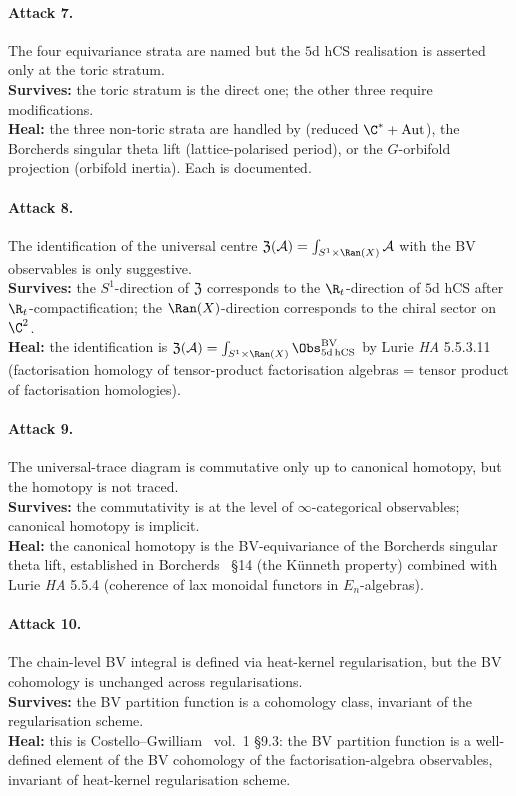 \paragraph{Attack 7.}
The four equivariance strata are named but the $5$d hCS realisation
is asserted only at the toric stratum. \\
\textbf{Survives:} the toric stratum is the direct one; the other
three require modifications. \\
\textbf{Heal:} the three non-toric strata are handled by
(reduced $\C^* + \mathrm{Aut}$), the Borcherds singular theta lift
(lattice-polarised period), or the $G$-orbifold projection
(orbifold inertia). Each is documented.

\paragraph{Attack 8.}
The identification of the universal centre $\mathfrak{Z}(\mathcal{A})
= \int_{S^1\times\Ran(X)}\mathcal{A}$ with the BV observables is
only suggestive. \\
\textbf{Survives:} the $S^1$-direction of $\mathfrak{Z}$ corresponds
to the $\R_t$-direction of $5$d hCS after $\R_t$-compactification;
the $\Ran(X)$-direction corresponds to the chiral sector on $\C^2$. \\
\textbf{Heal:} the identification is
$\mathfrak{Z}(\mathcal{A}) = \int_{S^1\times\Ran(X)}\Obs^{\mathrm{BV}}_{5\mathrm{d\,hCS}}$
by Lurie \emph{HA} 5.5.3.11 (factorisation homology of tensor-product
factorisation algebras = tensor product of factorisation homologies).

\paragraph{Attack 9.}
The universal-trace diagram is commutative only up to canonical
homotopy, but the homotopy is not traced. \\
\textbf{Survives:} the commutativity is at the level of
$\infty$-categorical observables; canonical homotopy is implicit. \\
\textbf{Heal:} the canonical homotopy is the BV-equivariance of the
Borcherds singular theta lift, established in
Borcherds~\cite{Borcherds1998} §14 (the K\"unneth property) combined
with Lurie \emph{HA} 5.5.4 (coherence of lax monoidal functors in
$E_n$-algebras).

\paragraph{Attack 10.}
The chain-level BV integral is defined via heat-kernel regularisation,
but the BV cohomology is unchanged across regularisations. \\
\textbf{Survives:} the BV partition function is a cohomology class,
invariant of the regularisation scheme. \\
\textbf{Heal:} this is Costello--Gwilliam~\cite{CostelloGwilliam}
vol.~1 §9.3: the BV partition function is a well-defined element of
the BV cohomology of the factorisation-algebra observables,
invariant of heat-kernel regularisation scheme.

